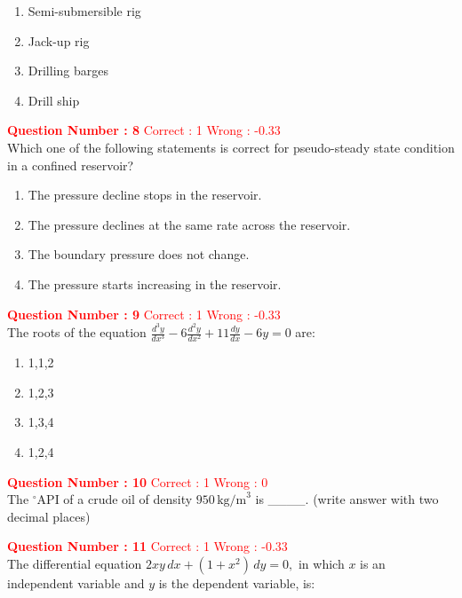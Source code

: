 \documentclass[12pt]{article}
\begin{document}
{\begin{enumerate}[label=(\Alph*)]
    \item Semi-submersible rig
    \item Jack-up rig
    \item Drilling barges
    \item Drill ship
\end{enumerate}

\textbf{\textcolor{red}{Question Number : 8}} \hfill \textcolor{red}{Correct : 1  Wrong : -0.33} \\[1ex]
Which one of the following statements is correct for pseudo-steady state condition in a confined reservoir?

\begin{enumerate}[label=(\Alph*)]
    \item The pressure decline stops in the reservoir.
    \item The pressure declines at the same rate across the reservoir.
    \item The boundary pressure does not change.
    \item The pressure starts increasing in the reservoir.
\end{enumerate}

\vspace{2ex}

\textbf{\textcolor{red}{Question Number : 9}} \hfill \textcolor{red}{Correct : 1  Wrong : -0.33} \\[1ex]
The roots of the equation 
{\LARGE$ 
\frac{d^3 y}{dx^3} - 6 \frac{d^2 y}{dx^2} + 11 \frac{dy}{dx} - 6y = 0
$ }
are:

\begin{enumerate}[label=(\Alph*)]
    \item 1,1,2
    \item 1,2,3
    \item 1,3,4
    \item 1,2,4
\end{enumerate}

\vspace{2ex}

\textbf{\textcolor{red}{Question Number : 10}} \hfill \textcolor{red}{Correct : 1  Wrong : 0} \\[1ex]
The $^\circ$API of a crude oil of density $950 \, \text{kg/m}^3$ is \_\_\_\_. (write answer with two decimal places)

\vspace{3ex}

\textbf{\textcolor{red}{Question Number : 11}} \hfill \textcolor{red}{Correct : 1  Wrong : -0.33} \\[1ex]
The differential equation 
{\LARGE$
2xy \, dx + (1 + x^2) \, dy = 0,
$}
in which $x$ is an independent variable and $y$ is the dependent variable, is:

}
\end{document}
